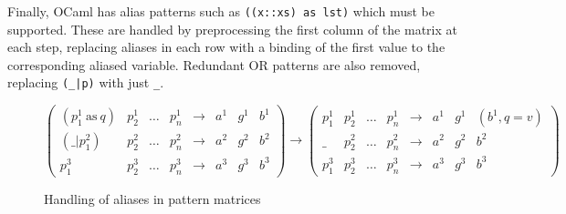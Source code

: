 
Finally, OCaml has alias patterns such as \verb|((x::xs) as lst)| which must be supported. These are handled by preprocessing the first column of the matrix at each step, replacing aliases in each row with a binding of the first value to the corresponding aliased variable. Redundant OR patterns are also removed, replacing \verb"(_|p)" with just \verb|_|.

\begin{figure}[H]
$
\begin{pmatrix}
(p^1_1\ \mathrm{as}\ q) & p^1_2 & \dots & p^1_n & \to & a^1 & g^1 & b^1 \\
(\_ | p^2_1) & p^2_2 & \dots & p^2_n & \to & a^2 & g^2 & b^2 \\
p^3_1 & p^3_2 & \dots & p^3_n & \to & a^3 & g^3 & b^3
\end{pmatrix}
\to
\begin{pmatrix}
 p^1_1 & p^1_2 & \dots & p^1_n  & \to & a^1 & g^1 & (b^1, q=v) \\
\_ & p^2_2 & \dots & p^2_n  & \to & a^2 & g^2 & b^2 \\
p^3_1 & p^3_2 & \dots & p^3_n  & \to & a^3 & g^3 & b^3
\end{pmatrix}
$
\caption{Handling of aliases in pattern matrices}
\end{figure}


